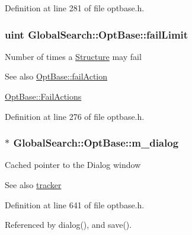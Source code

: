 Definition at line 281 of file optbase.\+h.

\hypertarget{classGlobalSearch_1_1OptBase_aec8bb712a35c23ab79608a5d70f52b90}{}
\subsubsection[{fail\+Limit}]{\setlength{\rightskip}{0pt plus 5cm}uint Global\+Search\+::\+Opt\+Base\+::fail\+Limit}\label{classGlobalSearch_1_1OptBase_aec8bb712a35c23ab79608a5d70f52b90}
Number of times a \hyperlink{classGlobalSearch_1_1Structure}{Structure} may fail \begin{DoxySeeAlso}{See also}
\hyperlink{classGlobalSearch_1_1OptBase_adda17a1eab956c00c6b14ab3ae451b91}{Opt\+Base\+::fail\+Action} 

\hyperlink{classGlobalSearch_1_1OptBase_a970b328cd0a36335c34c6b24c6ac2775}{Opt\+Base\+::\+Fail\+Actions} 
\end{DoxySeeAlso}


Definition at line 276 of file optbase.\+h.

\hypertarget{classGlobalSearch_1_1OptBase_a4673e81b57e648320474bf3024906161}{}
\subsubsection[{m\+\_\+dialog}]{$\ast$ Global\+Search\+::\+Opt\+Base\+::m\+\_\+dialog\hspace{0.3cm}{\ttfamily [protected]}}\label{classGlobalSearch_1_1OptBase_a4673e81b57e648320474bf3024906161}
Cached pointer to the Dialog window \begin{DoxySeeAlso}{See also}
\hyperlink{classGlobalSearch_1_1OptBase_a304d0d10064bd3913c8089aca76067d6}{tracker} 
\end{DoxySeeAlso}


Definition at line 641 of file optbase.\+h.



Referenced by dialog(), and save().

\hypertarget{classGlobalSearch_1_1OptBase_af9223062bbb616246d5bf60ad29e1c7d}{}
